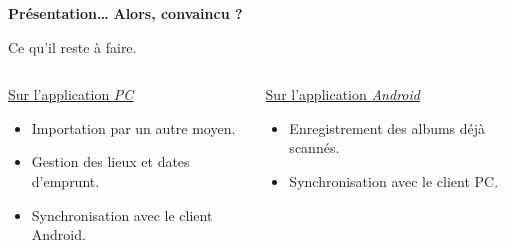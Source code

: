 \documentclass{beamer}
\begin{document}
\begin{frame}
\textbf{Présentation…}
\pause
\textbf{Alors, convaincu ?}
\end{frame}

\begin{frame}{Ce qu'il reste à faire.}
\begin{columns}
\begin{column}[c]{5cm}
\underline{Sur l'application \emph{PC}}
\begin{itemize}
\pause \item Importation par un autre moyen.
\pause \item Gestion des lieux et dates d'emprunt.
\pause \item Synchronisation avec le client Android.
\end{itemize}
\end{column}

\pause 

\begin{column}[c]{5cm}
\underline{Sur l'application \emph{Android}}
\begin{itemize}
\pause \item Enregistrement des albums déjà scannés.
\pause \item Synchronisation avec le client PC.
\end{itemize}
\end{column}

\end{columns}
\end{frame}
\end{document}
